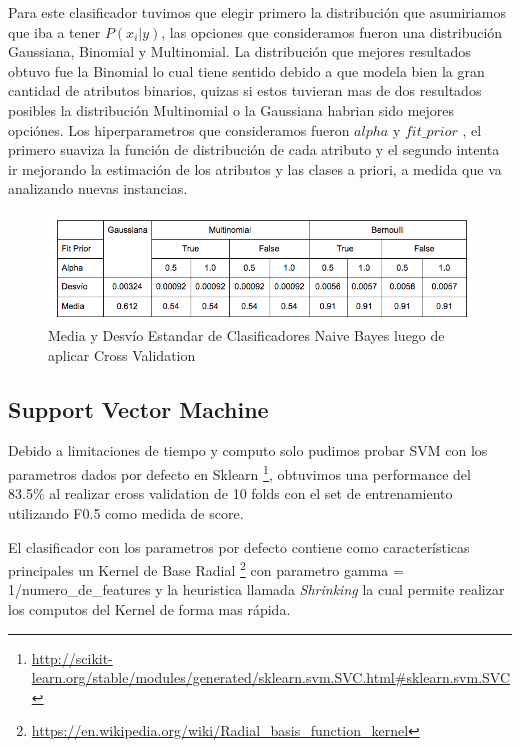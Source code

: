 \begin{enumerate}
Para este clasificador tuvimos que elegir primero la distribución que asumiriamos que iba a tener $ P(x_i | y) $, las opciones que consideramos fueron una distribución Gaussiana, Binomial y Multinomial. La distribución que mejores resultados obtuvo fue la Binomial lo cual tiene sentido debido a que modela bien la gran cantidad de atributos binarios, quizas si estos tuvieran mas de dos resultados posibles la distribución Multinomial o la Gaussiana habrian sido mejores opciónes.
Los hiperparametros que consideramos fueron $alpha$ y $fit\_prior$ , el primero suaviza la función de distribución de cada atributo y el segundo intenta ir mejorando la estimación de los atributos y las clases a priori, a medida que va analizando nuevas instancias.

\begin{figure}[H]
    \centering
        \includegraphics[width=\textwidth]{plots/tabla_nb.png}
        \caption{Media y Desvío Estandar de Clasificadores Naive Bayes luego de aplicar Cross Validation}
        \label{fig:nb_f05}
\end{figure}

\subsection{Support Vector Machine}

Debido a limitaciones de tiempo y computo solo pudimos probar SVM con los parametros dados por defecto en Sklearn \footnote{\url{http://scikit-learn.org/stable/modules/generated/sklearn.svm.SVC.html\#sklearn.svm.SVC}}, obtuvimos una performance del 83.5\% al realizar cross validation de 10 folds con el set de entrenamiento utilizando F0.5 como medida de score.

El clasificador con los parametros por defecto contiene como características principales un Kernel de Base Radial \footnote{\url{https://en.wikipedia.org/wiki/Radial_basis_function_kernel}} con parametro gamma = 1/numero\_de\_features y la heuristica llamada \textit{Shrinking} la cual permite realizar los computos del Kernel de forma mas rápida.

\end{enumerate}
